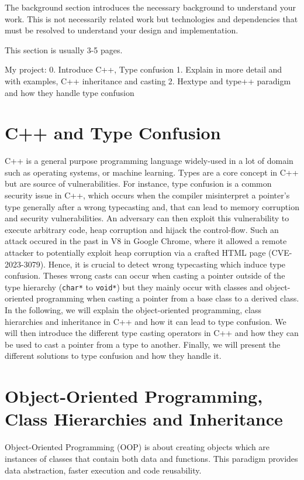 \documentclass[a4paper,11pt,oneside]{report}
\begin{document}
The background section introduces the necessary background to understand your
work. This is not necessarily related work but technologies and dependencies
that must be resolved to understand your design and implementation.

This section is usually 3-5 pages.

My project:
0. Introduce C++, Type confusion
1. Explain in more detail and with examples, C++ inheritance and casting
2. Hextype and type++ paradigm and how they handle type confusion

\section{C++ and Type Confusion}

C++ is a general purpose programming language widely-used in a lot of domain such as operating systems, 
or machine learning. Types are a core concept in C++ but are source of vulnerabilities. For instance, type confusion 
is a common security issue in C++, which occurs when the compiler misinterpret a pointer's type generally after a wrong typecasting and,
that can lead to memory corruption and security vulnerabilities. An adversary can then exploit this vulnerability to execute arbitrary code, heap corruption and hijack the control-flow.
Such an attack occured in the past in V8 in Google Chrome, where it allowed a remote attacker to potentially exploit
heap corruption via a crafted HTML page (CVE-2023-3079). Hence, it is crucial to detect wrong typecasting which induce type confusion. 
Theses wrong casts can occur when casting a pointer outside of the type hierarchy (\texttt{char*} to \texttt{void*}) but they mainly occur with classes and object-oriented programming 
when casting a pointer from a base class to a derived class. In the following, we will explain the object-oriented programming, class hierarchies and inheritance in C++ and how it can lead to type confusion. 
We will then introduce the different type casting operators in C++ and how they can be used to cast a pointer from a type to another. Finally, we will present the different solutions to type confusion and how they handle it.

\section{Object-Oriented Programming, Class Hierarchies and Inheritance}
Object-Oriented Programming (OOP) is about creating objects which are instances of classes that contain both data and functions. This paradigm provides
data abstraction, faster execution and code reusability. 
\end{document}
